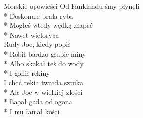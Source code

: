 \begin{piosenka_dluga}{Morskie opowieści}
Od Fanklandu-śmy płynęli \\*
Doskonale brała ryba \\*
Mogłeś wtedy wędką złapać \\*
Nawet wieloryba \\[\zwrotkaspace]

Rudy Joe, kiedy popił \\*
Robił bardzo głupie miny \\*
Albo skakał też do wody \\*
I gonił rekiny \\[\zwrotkaspace]

I choć rekin twarda sztuka \\*
Ale Joe w wielkiej złości \\*
Łapał gada od ogona \\*
I mu łamał kości \\[\zwrotkaspace]

\end{piosenka_dluga}
